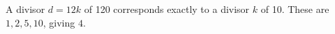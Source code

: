 A divisor $d=12k$ of 120 corresponds exactly to a divisor $k$ of 10. These are $1,2,5,10$, giving $\boxed4$.

